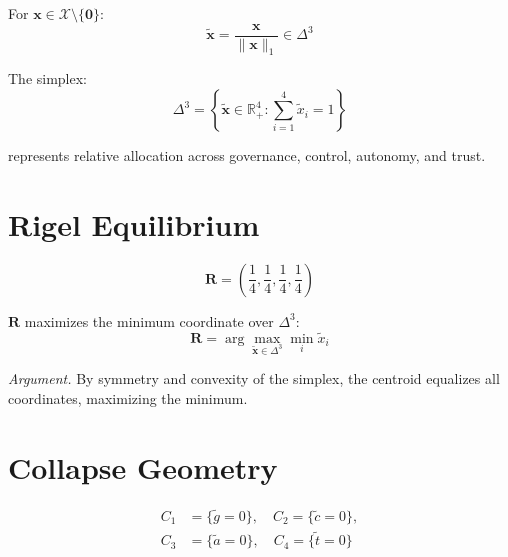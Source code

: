 \documentclass[letterpaper, 10 pt, conference]{ieeeconf}
\begin{document}
\begin{definition}
For $\mathbf{x} \in \mathcal{X} \setminus \{\mathbf{0}\}$:
\begin{equation}
\tilde{\mathbf{x}} = \frac{\mathbf{x}}{\|\mathbf{x}\|_1} \in \Delta^3
\end{equation}
\end{definition}

The simplex:
\begin{equation}
\Delta^3 = \left\{ \tilde{\mathbf{x}} \in \mathbb{R}^4_+ : \sum_{i=1}^4 \tilde{x}_i = 1 \right\}
\end{equation}

represents relative allocation across governance, control, autonomy, and trust.

\section{Rigel Equilibrium}

\begin{definition}
\begin{equation}
\mathbf{R} = \left(\frac{1}{4}, \frac{1}{4}, \frac{1}{4}, \frac{1}{4}\right)
\end{equation}
\end{definition}

\begin{proposition}
$\mathbf{R}$ maximizes the minimum coordinate over $\Delta^3$:
\begin{equation}
\mathbf{R} = \arg\max_{\tilde{\mathbf{x}} \in \Delta^3} \min_i \tilde{x}_i
\end{equation}
\end{proposition}

\textit{Argument.}
By symmetry and convexity of the simplex, the centroid equalizes all coordinates, maximizing the minimum.

\section{Collapse Geometry}

\begin{definition}
\begin{align}
C_1 &= \{\tilde{g}=0\}, \quad
C_2 = \{\tilde{c}=0\}, \\
C_3 &= \{\tilde{a}=0\}, \quad
C_4 = \{\tilde{t}=0\}
\end{align}
\end{definition}
\end{document}
